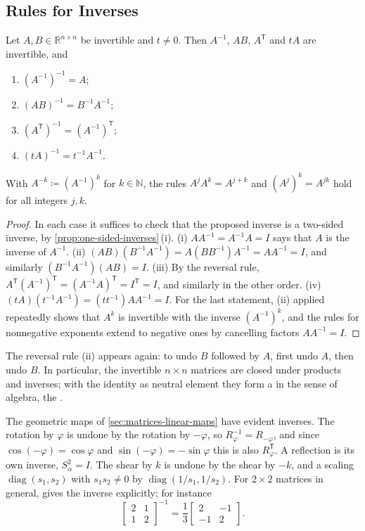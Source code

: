 \subsection{Rules for Inverses}

\begin{proposition}
\label{prop:inverse-rules}
Let $A,B\in\mathbb R^{n\times n}$ be invertible and $t\ne0$. Then $A^{-1}$, $AB$, $A^{\mathsf T}$ and $tA$ are invertible, and
\begin{enumerate}
\item $(A^{-1})^{-1}=A$;
\item $(AB)^{-1}=B^{-1}A^{-1}$;
\item $(A^{\mathsf T})^{-1}=(A^{-1})^{\mathsf T}$;
\item $(tA)^{-1}=t^{-1}A^{-1}$.
\end{enumerate}
With $A^{-k}\coloneqq(A^{-1})^k$ for $k\in\mathbb N$, the rules $A^jA^k=A^{j+k}$ and $(A^j)^k=A^{jk}$ hold for all integers $j,k$.
\end{proposition}

\begin{proof}
In each case it suffices to check that the proposed inverse is a two-sided inverse, by \cref{prop:one-sided-inverses}\,(i). (i) $AA^{-1}=A^{-1}A=I$ says that $A$ is the inverse of $A^{-1}$. (ii) $(AB)(B^{-1}A^{-1})=A(BB^{-1})A^{-1}=AA^{-1}=I$, and similarly $(B^{-1}A^{-1})(AB)=I$. (iii) By the reversal rule, $A^{\mathsf T}(A^{-1})^{\mathsf T}=(A^{-1}A)^{\mathsf T}=I^{\mathsf T}=I$, and similarly in the other order. (iv) $(tA)(t^{-1}A^{-1})=(tt^{-1})AA^{-1}=I$. For the last statement, (ii) applied repeatedly shows that $A^k$ is invertible with the inverse $(A^{-1})^k$, and the rules for nonnegative exponents extend to negative ones by cancelling factors $AA^{-1}=I$.
\end{proof}

The reversal rule (ii) appears again: to undo $B$ followed by $A$, first undo $A$, then undo $B$. In particular, the invertible $n\times n$ matrices are closed under products and inverses; with the identity as neutral element they form a  in the sense of algebra, the .

The geometric maps of \cref{sec:matrices-linear-maps} have evident inverses. The rotation by $\varphi$ is undone by the rotation by $-\varphi$, so $R_\varphi^{-1}=R_{-\varphi}$, and since $\cos(-\varphi)=\cos\varphi$ and $\sin(-\varphi)=-\sin\varphi$ this is also $R_\varphi^{\mathsf T}$. A reflection is its own inverse, $S_\alpha^2=I$. The shear by $k$ is undone by the shear by $-k$, and a scaling $\operatorname{diag}(s_1,s_2)$ with $s_1s_2\ne0$ by $\operatorname{diag}(1/s_1,1/s_2)$. For $2\times2$ matrices in general,  gives the inverse explicitly; for instance
\[
\begin{bmatrix}2&1\\1&2\end{bmatrix}^{-1}=\frac13\begin{bmatrix}2&-1\\-1&2\end{bmatrix}.
\]

